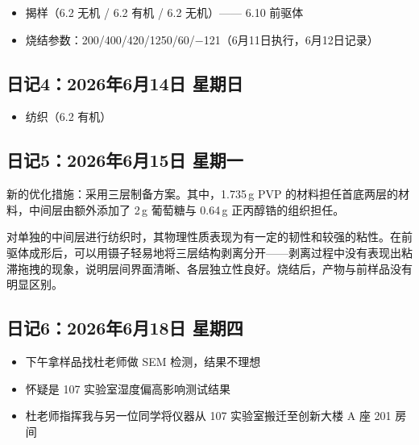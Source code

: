 \documentclass[a4paper, 12pt]{ctexart}
\begin{document}
\begin{itemize}
  \item 揭样（6.2 无机 / 6.2 有机 / 6.2 无机）—— 6.10 前驱体
  \item 烧结参数：200/400/420/1250/60/−121（6月11日执行，6月12日记录）
\end{itemize}

\vspace{1.5cm}

\subsection*{日记4：2026年6月14日 \quad 星期日}

\begin{itemize}
  \item 纺织（6.2 有机）
\end{itemize}

\vspace{1.5cm}

\subsection*{日记5：2026年6月15日 \quad 星期一}

新的优化措施：采用三层制备方案。其中，1.735\,g PVP 的材料担任首底两层的材料，中间层由额外添加了 2\,g 葡萄糖与 0.64\,g 正丙醇锆的组织担任。

对单独的中间层进行纺织时，其物理性质表现为有一定的韧性和较强的粘性。在前驱体成形后，可以用镊子轻易地将三层结构剥离分开——剥离过程中没有表现出粘滞拖拽的现象，说明层间界面清晰、各层独立性良好。烧结后，产物与前样品没有明显区别。

\vspace{1.5cm}

\subsection*{日记6：2026年6月18日 \quad 星期四}

\begin{itemize}
  \item 下午拿样品找杜老师做 SEM 检测，结果不理想
  \item 怀疑是 107 实验室湿度偏高影响测试结果
  \item 杜老师指挥我与另一位同学将仪器从 107 实验室搬迁至创新大楼 A 座 201 房间
\end{itemize}
\end{document}
